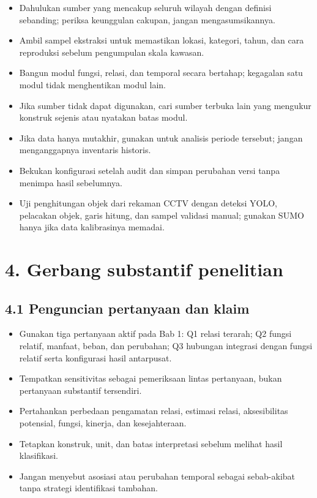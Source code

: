 \documentclass[
  indonesian,
  11pt,
]{article}
\providecommand{\tightlist}{%
  \setlength{\itemsep}{0pt}\setlength{\parskip}{0pt}}
\renewcommand{\tightlist}{%
  \setlength{\itemsep}{0.22em}%
  \setlength{\parskip}{0pt}%
}
\begin{document}
\begin{itemize}
\tightlist
\item[$\square$]
  Dahulukan sumber yang mencakup seluruh wilayah dengan definisi
  sebanding; periksa keunggulan cakupan, jangan mengasumsikannya.
\item[$\square$]
  Ambil sampel ekstraksi untuk memastikan lokasi, kategori, tahun, dan
  cara reproduksi sebelum pengumpulan skala kawasan.
\item[$\square$]
  Bangun modul fungsi, relasi, dan temporal secara bertahap; kegagalan
  satu modul tidak menghentikan modul lain.
\item[$\square$]
  Jika sumber tidak dapat digunakan, cari sumber terbuka lain yang
  mengukur konstruk sejenis atau nyatakan batas modul.
\item[$\square$]
  Jika data hanya mutakhir, gunakan untuk analisis periode tersebut;
  jangan menganggapnya inventaris historis.
\item[$\square$]
  Bekukan konfigurasi setelah audit dan simpan perubahan versi tanpa
  menimpa hasil sebelumnya.
\item[$\square$]
  Uji penghitungan objek dari rekaman CCTV dengan deteksi YOLO,
  pelacakan objek, garis hitung, dan sampel validasi manual; gunakan
  SUMO hanya jika data kalibrasinya memadai.
\end{itemize}

\section{4. Gerbang substantif
penelitian}\label{gerbang-substantif-penelitian}

\subsection{4.1 Penguncian pertanyaan dan
klaim}\label{penguncian-pertanyaan-dan-klaim}

\begin{itemize}
\tightlist
\item[$\square$]
  Gunakan tiga pertanyaan aktif pada Bab 1: Q1 relasi terarah; Q2 fungsi
  relatif, manfaat, beban, dan perubahan; Q3 hubungan integrasi dengan
  fungsi relatif serta konfigurasi hasil antarpusat.
\item[$\square$]
  Tempatkan sensitivitas sebagai pemeriksaan lintas pertanyaan, bukan
  pertanyaan substantif tersendiri.
\item[$\square$]
  Pertahankan perbedaan pengamatan relasi, estimasi relasi,
  aksesibilitas potensial, fungsi, kinerja, dan kesejahteraan.
\item[$\square$]
  Tetapkan konstruk, unit, dan batas interpretasi sebelum melihat hasil
  klasifikasi.
\item[$\square$]
  Jangan menyebut asosiasi atau perubahan temporal sebagai sebab-akibat
  tanpa strategi identifikasi tambahan.
\end{itemize}
\end{document}
